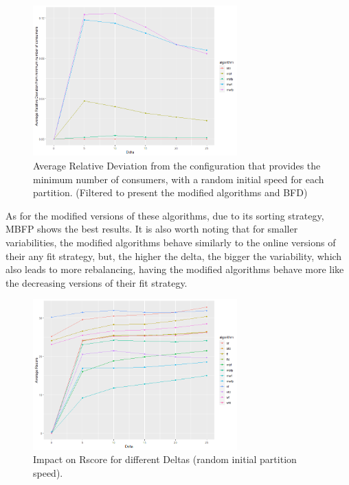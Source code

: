 \begin{figure}[H]
    \centering
    \includegraphics[width=0.7\textwidth]{images/controller/Relative Number of Consumer Modified.png}
\caption{Average Relative Deviation from the configuration that provides the minimum number of consumers, with a random initial speed for each partition. (Filtered to present the modified algorithms and BFD)}
\label{fig:relative_nconsumers_modified}
\end{figure}

As for the modified versions of these algorithms, due to its sorting strategy, MBFP shows the best results. It is also worth noting that for smaller variabilities, the modified algorithms behave similarly to the online versions of their any fit strategy, but, the higher the delta, the bigger the variability, which also leads to more rebalancing, having the modified algorithms behave more like the decreasing versions of their fit strategy.

\begin{figure}[H]
    \centering
    \includegraphics[width=0.7\textwidth]{images/controller/Rscore.png}
\caption{Impact on Rscore for different Deltas (random initial partition speed).}
\label{fig:rscore}
\end{figure}

